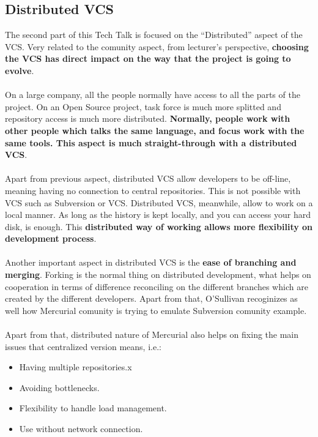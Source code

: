 \documentclass[11pt]{article}
\begin{document}
\subsection{Distributed VCS}
The second part of this Tech Talk is focused on the ``Distributed'' aspect of the VCS. Very related to the comunity aspect, from lecturer's perspective, \textbf{choosing the VCS has direct impact on the way that the project is going to evolve}.\\
\\
On a large company, all the people normally have access to all the parts of the project. On an Open Source project, task force is much more splitted and repository access is much more distributed. \textbf{Normally, people work with other people which talks the same language, and focus work with the same tools. This aspect is much straight-through with a distributed VCS}.\\
\\
Apart from previous aspect, distributed VCS allow developers to be off-line, meaning having no connection to central repositories. This is not possible with VCS such as Subversion or VCS. Distributed VCS, meanwhile, allow to work on a local manner. As long as the history is kept locally, and you can access your hard disk, is enough. This \textbf{distributed way of working allows more flexibility on development process}.\\
\\
Another important aspect in distributed VCS is the \textbf{ease of branching and merging}. Forking is the normal thing on distributed development, what helps on cooperation in terms of difference reconciling on the different branches which are created by the different developers. Apart from that, O'Sullivan recoginizes as well how Mercurial comunity is trying to emulate Subversion comunity example.\\
\\
Apart from that, distributed nature of Mercurial also helps on fixing the main issues that centralized version means, i.e.:
\begin{itemize}\itemsep0pt
\item{Having multiple repositories}.x
\item{Avoiding bottlenecks}.
\item{Flexibility to handle load management}.
\item{Use without network connection}.
\end{itemize}
\end{document}

